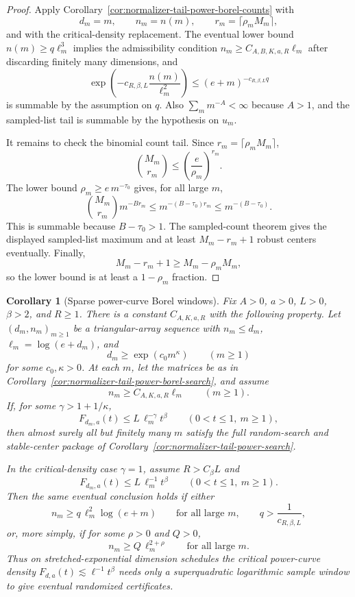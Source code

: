 \documentclass[11pt]{amsart}
\numberwithin{equation}{section}
\newtheorem{corollary}[theorem]{Corollary}
\theoremstyle{definition}
\theoremstyle{remark}
\begin{document}
\begin{proof}
Apply Corollary~\ref{cor:normalizer-tail-power-borel-counts} with
\[
  d_m=m,\qquad n_m=n(m),\qquad r_m=\lceil\rho_mM_m\rceil ,
\]
and with the critical-density replacement.  The eventual lower bound
\(n(m)\ge q\ell_m^3\) implies the admissibility condition
\(n_m\ge C_{A,B,K,a,R}\ell_m\) after discarding finitely many dimensions, and
\[
  \exp\left(-c_{R,\beta,L}\frac{n(m)}{\ell_m^2}\right)
  \le (e+m)^{-c_{R,\beta,L}q}
\]
is summable by the assumption on \(q\).  Also \(\sum_m m^{-A}<\infty\) because
\(A>1\), and the sampled-list tail is summable by the hypothesis on \(u_m\).

It remains to check the binomial count tail.  Since
\(r_m=\lceil\rho_mM_m\rceil\),
\[
  \binom{M_m}{r_m}
  \le \left(\frac e{\rho_m}\right)^{r_m}.
\]
The lower bound \(\rho_m\ge e\,m^{-\tau_0}\) gives, for all large \(m\),
\[
  \binom{M_m}{r_m}m^{-B r_m}
  \le m^{-(B-\tau_0)r_m}\le m^{-(B-\tau_0)}.
\]
This is summable because \(B-\tau_0>1\).  The sampled-count theorem gives the
displayed sampled-list maximum and at least \(M_m-r_m+1\) robust centers
eventually.  Finally,
\[
  M_m-r_m+1\ge M_m-\rho_mM_m,
\]
so the lower bound is at least a \(1-\rho_m\) fraction.
\end{proof}

\begin{corollary}[Sparse power-curve Borel windows]
\label{cor:normalizer-tail-power-borel-window}
Fix \(A>0\), \(a>0\), \(L>0\), \(\beta>2\), and \(R\ge1\).  There is a
constant \(C_{A,K,a,R}\) with the following property.  Let \((d_m,n_m)_{m\ge1}\)
be a triangular-array sequence with \(n_m\le d_m\), \(\ell_m=\log(e+d_m)\), and
\[
  d_m\ge \exp(c_0m^\kappa)
  \qquad(m\ge1)
\]
for some \(c_0,\kappa>0\).  At each \(m\), let the matrices be as in
Corollary~\ref{cor:normalizer-tail-power-borel-search}, and assume
\[
  n_m\ge C_{A,K,a,R}\ell_m
  \qquad(m\ge1).
\]
If, for some \(\gamma>1+1/\kappa\),
\[
  F_{d_m,a}(t)\le L\,\ell_m^{-\gamma}t^\beta
  \qquad(0<t\le1,\ m\ge1),
\]
then almost surely all but finitely many \(m\) satisfy the full random-search
and stable-center package of
Corollary~\ref{cor:normalizer-tail-power-search}.

In the critical-density case \(\gamma=1\), assume \(R>C_\beta L\) and
\[
  F_{d_m,a}(t)\le L\,\ell_m^{-1}t^\beta
  \qquad(0<t\le1,\ m\ge1).
\]
Then the same eventual conclusion holds if either
\[
  n_m\ge q\,\ell_m^2\log(e+m)
  \qquad\text{for all large }m,\qquad
  q>\frac1{c_{R,\beta,L}},
\]
or, more simply, if for some \(\rho>0\) and \(Q>0\),
\[
  n_m\ge Q\,\ell_m^{2+\rho}
  \qquad\text{for all large }m .
\]
Thus on stretched-exponential dimension schedules the critical power-curve
density \(F_{d,a}(t)\lesssim \ell^{-1}t^\beta\) needs only a superquadratic
logarithmic sample window to give eventual randomized certificates.
\end{corollary}
\end{document}
